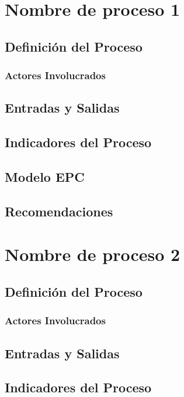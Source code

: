 \documentclass[12pt,letterpaper]{article}
\begin{document}
\section{Nombre de proceso 1}

\subsection{Definición del Proceso}

\subsubsection{Actores Involucrados}

\subsection{Entradas y Salidas}

\subsection{Indicadores del Proceso}

\subsection{Modelo EPC}

\subsection{Recomendaciones}

\section{Nombre de proceso 2}

\subsection{Definición del Proceso}

\subsubsection{Actores Involucrados}

\subsection{Entradas y Salidas}

\subsection{Indicadores del Proceso}
\end{document}
